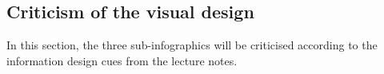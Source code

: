 \documentclass[a4paper]{scrartcl}
\begin{document}
\subsection{Criticism of the visual design}

In this section, the three sub-infographics will be criticised according to the information design cues from the lecture notes.

\end{document}
